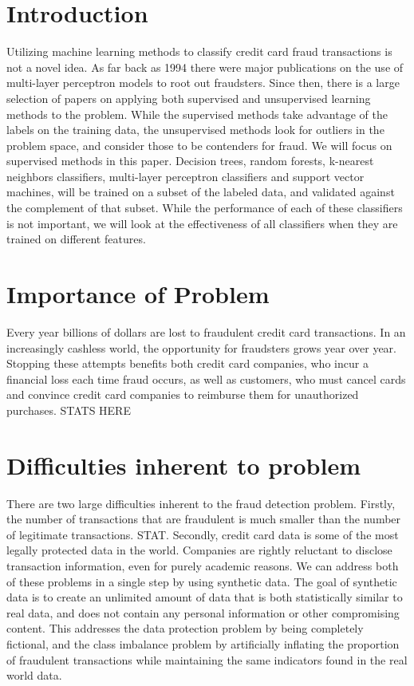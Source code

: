 \documentclass{article}
\begin{document}
\section{Introduction}
	Utilizing machine learning methods to classify credit card fraud transactions is not a novel idea. As far back as 1994 there were major publications on the use of multi-layer perceptron models to root out fraudsters. Since then, there is a large selection of papers on applying both supervised and unsupervised learning methods to the problem. While the supervised methods take advantage of the labels on the training data, the unsupervised methods look for outliers in the problem space, and consider those to be contenders for fraud. We will focus on supervised methods in this paper. Decision trees, random forests, k-nearest neighbors classifiers, multi-layer perceptron classifiers and support vector machines, will be trained on a subset of the labeled data, and validated against the complement of that subset. While the performance of each of these classifiers is not important, we will look at the effectiveness of all classifiers when they are trained on different features. 

\section{Importance of Problem}
	Every year billions of dollars are lost to fraudulent credit card transactions. In an increasingly cashless world, the opportunity for fraudsters grows year over year. Stopping these attempts benefits both credit card companies, who incur a financial loss each time fraud occurs, as well as customers, who must cancel cards and convince credit card companies to reimburse them for unauthorized purchases. STATS HERE

\section{Difficulties inherent to problem}
	There are two large difficulties inherent to the fraud detection problem. Firstly, the number of transactions that are fraudulent is much smaller than the number of legitimate transactions. STAT. Secondly, credit card data is some of the most legally protected data in the world. Companies are rightly reluctant to disclose transaction information, even for purely academic reasons. We can address both of these problems in a single step by using synthetic data. The goal of synthetic data is to create an unlimited amount of data that is both statistically similar to real data, and does not contain any personal information or other compromising content. This addresses the data protection problem by being completely fictional, and the class imbalance problem by artificially inflating the proportion of fraudulent transactions while maintaining the same indicators found in the real world data. 
\end{document}
